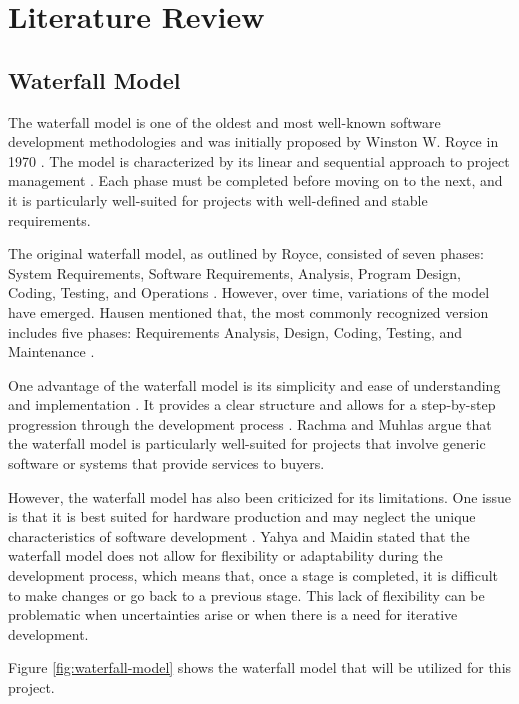\chapter{Literature Review}
\label{chapter:literature-review}

\section{Waterfall Model}
\label{sec:waterfall-model}

The waterfall model is one of the oldest and most well-known software development methodologies and was initially proposed by Winston W. Royce in 1970 \cite{royce70}. The model is characterized by its linear and sequential approach to project management \cite{Novianti2023}. Each phase must be completed before moving on to the next, and it is particularly well-suited for projects with well-defined and stable requirements.

The original waterfall model, as outlined by Royce, consisted of seven phases: System Requirements, Software Requirements, Analysis, Program Design, Coding, Testing, and Operations \cite{royce70}.  However, over time, variations of the model have emerged. Hausen \cite{Hausen} mentioned that, the most commonly recognized version includes five phases: Requirements Analysis, Design, Coding, Testing, and Maintenance .

One advantage of the waterfall model is its simplicity and ease of understanding and implementation \cite{Sunardi2020}. It provides a clear structure and allows for a step-by-step progression through the development process \cite{Sunardi2020}. Rachma and Muhlas \cite{Rachma2022} argue that the waterfall model is particularly well-suited for projects that involve generic software or systems that provide services to buyers.

However, the waterfall model has also been criticized for its limitations. One issue is that it is best suited for hardware production and may neglect the unique characteristics of software development \cite{Zahia14}. Yahya and Maidin \cite{Yahya2023} stated that the waterfall model does not allow for flexibility or adaptability during the development process, which means that, once a stage is completed, it is difficult to make changes or go back to a previous stage. This lack of flexibility can be problematic when uncertainties arise or when there is a need for iterative development.

Figure \ref{fig:waterfall-model} shows the waterfall model that will be utilized for this project.

